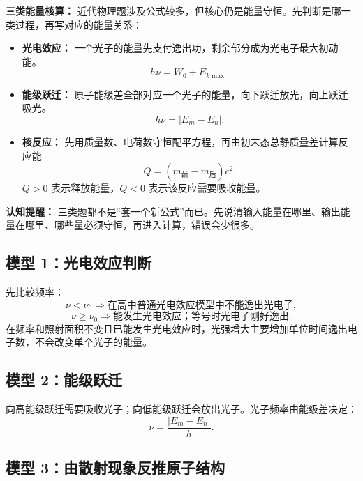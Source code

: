 \textbf{三类能量核算：} 近代物理题涉及公式较多，但核心仍是能量守恒。先判断是哪一类过程，再写对应的能量关系：
\begin{itemize}
  \item \textbf{光电效应：} 一个光子的能量先支付逸出功，剩余部分成为光电子最大初动能。
  \[
  h\nu=W_0+E_{k\max}.
  \]
  \item \textbf{能级跃迁：} 原子能级差全部对应一个光子的能量，向下跃迁放光，向上跃迁吸光。
  \[
  h\nu=|E_m-E_n|.
  \]
  \item \textbf{核反应：} 先用质量数、电荷数守恒配平方程，再由初末态总静质量差计算反应能
  \[
  Q=(m_{\text{前}}-m_{\text{后}})c^2.
  \]
  $Q>0$ 表示释放能量，$Q<0$ 表示该反应需要吸收能量。
\end{itemize}

\textbf{认知提醒：} 三类题都不是“套一个新公式”而已。先说清输入能量在哪里、输出能量在哪里、哪些量必须守恒，再进入计算，错误会少很多。

\subsection*{模型 1：光电效应判断}

先比较频率：
\[
\nu<\nu_0\Rightarrow\text{在高中普通光电效应模型中不能逸出光电子},
\]
\[
\nu\ge\nu_0\Rightarrow\text{能发生光电效应；等号时光电子刚好逸出}.
\]
在频率和照射面积不变且已能发生光电效应时，光强增大主要增加单位时间逸出电子数，不会改变单个光子的能量。

\begin{center}


\label{fig:photoelectric-frequency-intensity}
\end{center}

\subsection*{模型 2：能级跃迁}

向高能级跃迁需要吸收光子；向低能级跃迁会放出光子。光子频率由能级差决定：
\[
\nu=\frac{|E_m-E_n|}{h}.
\]

\begin{center}


\label{fig:spectral-lines-from-levels}
\end{center}

\subsection*{模型 3：由散射现象反推原子结构}

